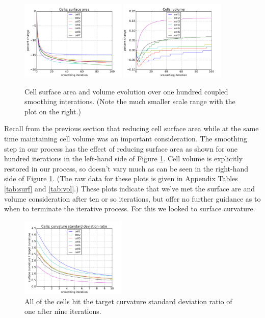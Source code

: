 \documentclass[a4paper,10pt]{article}
\begin{document}
\begin{figure}[H]
\begin{center}
\includegraphics[width=0.45\textwidth]{images/cell_surf_100.pdf}
\includegraphics[width=0.45\textwidth]{images/cell_vol_100.pdf}
\end{center}
\caption{Cell surface area and volume evolution over one hundred coupled smoothing interations. (Note the much smaller scale range with the plot on the right.)}
\label{fig:100_iterations}
\end{figure}

Recall from the previous section that reducing cell surface area while at the same time maintaining cell volume was an important consideration. The smoothing step in our process has the effect of reducing surface area as shown for one hundred iterations in the left-hand side of Figure \ref{fig:100_iterations}. Cell volume is explicitly restored in our process, so doesn't vary much as can be seen in the right-hand side of Figure \ref{fig:100_iterations}. (The raw data for these plots is given in Appendix Tables \ref{tab:surf} and \ref{tab:vol}.) These plots indicate that we've met the surface are and volume consideration after ten or so iterations, but offer no further guidance as to when to terminate the iterative process. For this we looked to surface curvature.\\

\begin{figure}[H]
\begin{center}
\includegraphics[width=0.45\textwidth]{images/cell_curv_std.pdf}
\end{center}
\caption{All of the cells hit the target curvature standard deviation ratio of one after nine iterations.}
\label{fig:curv_std}
\end{figure}
\end{document}
